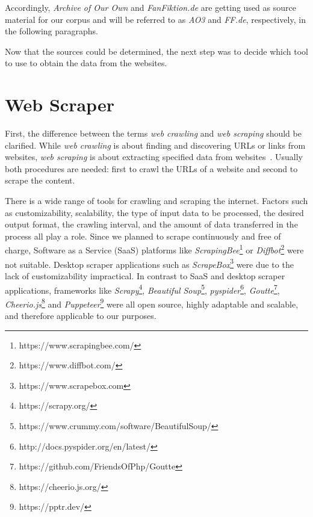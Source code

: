 Accordingly, \emph{Archive of Our Own} and \emph{FanFiktion.de} are getting used as source material for our corpus and will be referred to as \emph{AO3} and \emph{FF.de}, respectively, in the following paragraphs.


Now that the sources could be determined, the next step was to decide which tool to use to obtain the data from the websites.


\section{Web Scraper}\label{sec:web-scraper}

First, the difference between the terms \emph{web crawling} and \emph{web scraping} should be clarified.
While \emph{web crawling} is about finding and discovering URLs or links from websites, \emph{web scraping} is about extracting specified data from websites~\citep{Kenny2022WebCrawling}.
Usually both procedures are needed: first to crawl the URLs of a website and second to scrape the content.

There is a wide range of tools for crawling and scraping the internet.
Factors such as customizability, scalability, the type of input data to be processed, the desired output format, the crawling interval, and the amount of data transferred in the process all play a role.
Since we planned to scrape continuously and free of charge, Software as a Service (SaaS) platforms like \emph{ScrapingBee}\footnote{https://www.scrapingbee.com/} or \emph{Diffbot}\footnote{https://www.diffbot.com/} were not suitable.
Desktop scraper applications such as \emph{ScrapeBox}\footnote{https://www.scrapebox.com} were due to the lack of customizability impractical.
In contrast to SaaS and desktop scraper applications, frameworks like \emph{Scrapy}\footnote{https://scrapy.org/}, \emph{Beautiful Soup}\footnote{https://www.crummy.com/software/BeautifulSoup/}, \emph{pyspider}\footnote{http://docs.pyspider.org/en/latest/}, \emph{Goutte}\footnote{https://github.com/FriendsOfPhp/Goutte}, \emph{Cheerio.js}\footnote{https://cheerio.js.org/} and \emph{Puppeteer}\footnote{https://pptr.dev/} were all open source, highly adaptable and scalable, and therefore applicable to our purposes.

